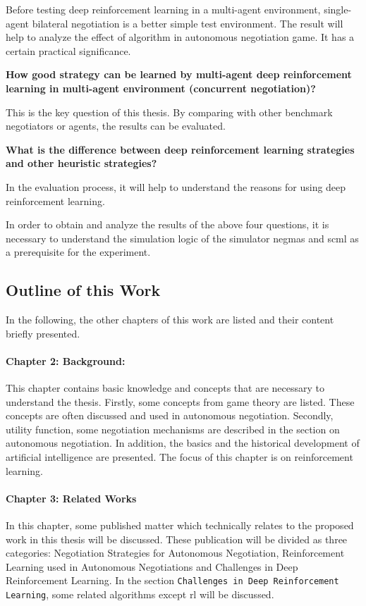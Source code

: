 Before testing deep reinforcement learning in a multi-agent environment, single-agent bilateral negotiation is a better simple test environment. The result will help to analyze the effect of algorithm in autonomous negotiation game. It has a certain practical significance.

\textbf{How good strategy can be learned by multi-agent deep reinforcement learning in multi-agent environment (concurrent negotiation)?}

This is the key question of this thesis. By comparing with other benchmark negotiators or agents, the results can be evaluated.

\textbf{What is the difference between deep reinforcement learning strategies and other heuristic strategies?}

In the evaluation process, it will help to understand the reasons for using deep reinforcement learning.

In order to obtain and analyze the results of the above four questions, it is necessary to understand the simulation logic of the simulator \gls{negmas} and \gls{scml} as a prerequisite for the experiment.

\subsection{Outline of this Work}
In the following, the other chapters of this work are listed and their content briefly presented.

\paragraph{Chapter 2: Background:}
This chapter contains basic knowledge and concepts that are necessary to understand the thesis. Firstly, some concepts from game theory are listed. These concepts are often discussed and used in autonomous negotiation. Secondly, utility function, some negotiation mechanisms are described in the section on autonomous negotiation. In addition, the basics and the historical development of artificial intelligence are presented. The focus of this chapter is on reinforcement learning.

\paragraph{Chapter 3: Related Works}
In this chapter, some published matter which technically relates to the proposed work in this thesis will be discussed. These publication will be divided as three categories: Negotiation Strategies for Autonomous Negotiation, Reinforcement Learning used in Autonomous Negotiations and Challenges in Deep Reinforcement Learning. In the section \texttt{Challenges in Deep Reinforcement Learning}, some related algorithms except \gls{rl} will be discussed.


